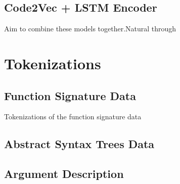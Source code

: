 
\subsection{Code2Vec + LSTM Encoder} %
\label{sub:code2vec_sequence_to_sequence}

Aim to combine these models together.Natural through 











\section{Tokenizations} %
\label{sec:tokenizations}

\subsection{Function Signature Data}

Tokenizations of the function signature data

\subsection{Abstract Syntax Trees Data }


\subsection{Argument Description}











